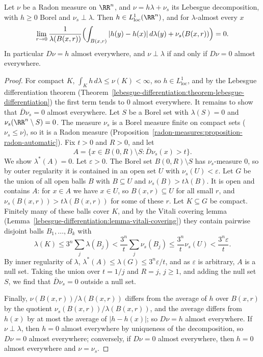 \begin{theorem}\label{radon-measures:theorem-differentiation-measures}
Let $\nu$ be a Radon measure on $\RR^n$, and $\nu = h\lambda + \nu_s$ its Lebesgue decomposition, with $h \geq 0$ Borel and $\nu_s \perp \lambda$. Then $h \in L^1_{\mathrm{loc}}(\RR^n)$, and for
$\lambda$-almost every $x$
\[
\lim_{r \to 0}\frac1{\lambda(B(x, r))}\Bigl(\int_{B(x, r)}|h(y) - h(x)|\,d\lambda(y) + \nu_s(B(x, r))\Bigr) = 0 .
\]
In particular $D\nu = h$ almost everywhere, and $\nu \perp \lambda$ if and only if $D\nu = 0$ almost everywhere.
\end{theorem}

\begin{proof}
For compact $K$, $\int_Kh\,d\lambda \leq \nu(K) < \infty$, so $h \in L^1_{\mathrm{loc}}$, and by the Lebesgue differentiation theorem
(Theorem~\ref{lebesgue-differentiation:theorem-lebesgue-differentiation}) the first term tends to $0$ almost everywhere. It remains to show that $\overline{D}\nu_s = 0$ almost everywhere. Let $S$ be a Borel set with
$\lambda(S) = 0$ and $\nu_s(\RR^n \setminus S) = 0$. The measure $\nu_s$ is a Borel measure finite on compact sets ($\nu_s \leq \nu$), so it is a Radon measure
(Proposition~\ref{radon-measures:proposition-radon-automatic}). Fix $t > 0$ and $R > 0$, and let
\[
A = \{x \in B(0, R) \setminus S : \overline{D}\nu_s(x) > t\}.
\]
We show $\lambda^*(A) = 0$. Let $\varepsilon > 0$. The Borel set $B(0, R) \setminus S$ has $\nu_s$-measure $0$, so by outer regularity it is contained in an open set $U$ with $\nu_s(U) < \varepsilon$. Let $G$ be
the union of all open balls $B$ with $B \subseteq U$ and $\nu_s(B) > t\lambda(B)$. It is open and contains $A$: for $x \in A$ we have $x \in U$, so $B(x, r) \subseteq U$ for all small $r$, and
$\nu_s(B(x, r)) > t\lambda(B(x, r))$ for some of these $r$. Let $K \subseteq G$ be compact. Finitely many of these balls cover $K$, and by the Vitali covering lemma
(Lemma~\ref{lebesgue-differentiation:lemma-vitali-covering}) they contain pairwise disjoint balls $B_1, \ldots, B_k$ with
\[
\lambda(K) \leq 3^n\sum_j\lambda(B_j) < \frac{3^n}{t}\sum_j\nu_s(B_j) \leq \frac{3^n}{t}\nu_s(U) < \frac{3^n\varepsilon}{t}.
\]
By inner regularity of $\lambda$, $\lambda^*(A) \leq \lambda(G) \leq 3^n\varepsilon/t$, and as $\varepsilon$ is arbitrary, $A$ is a null set. Taking the union over $t = 1/j$ and $R = j$, $j \geq 1$, and
adding the null set $S$, we find that $\overline{D}\nu_s = 0$ outside a null set.

Finally, $\nu(B(x, r))/\lambda(B(x, r))$ differs from the average of $h$ over $B(x, r)$ by the quotient $\nu_s(B(x, r))/\lambda(B(x, r))$, and the average differs from $h(x)$ by
at most the average of $|h - h(x)|$; so
$D\nu = h$ almost everywhere. If $\nu \perp \lambda$, then $h = 0$ almost everywhere by uniqueness of the decomposition, so $D\nu = 0$ almost everywhere; conversely, if $D\nu = 0$ almost everywhere,
then $h = 0$ almost everywhere and $\nu = \nu_s$.
\end{proof}

